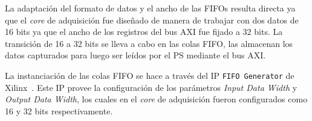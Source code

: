 \documentclass[../../main.tex]{subfiles}
\begin{document}

\begin{table}[H]
    \centering
    \caption{Diferencias a salvar para lograr la integración de la etapa de preprocesamiento.}\label{tab::diferencias-integracion}
    \end{table}

La adaptación del formato de datos y el ancho de las FIFOs resulta directa ya que el \textit{core} de adquisición fue diseñado de manera de trabajar con dos datos de 16 bits ya que el ancho de los registros del bus AXI fue fijado a 32 bits. La transición de 16 a 32 bits se lleva a cabo en las colas FIFO, las almacenan los datos capturados para luego ser leídos por el PS mediante el bus AXI.

La instanciación de las colas FIFO se hace a través del IP \texttt{FIFO Generator} de Xilinx~\cite{fifo-generator}. Este IP provee la configuración de los parámetros \textit{Input Data Width} y \textit{Output Data Width}, los cuales en el \textit{core} de adquisición fueron configurados como 16 y 32 bits respectivamente.
\end{document}
